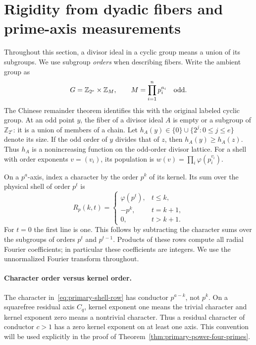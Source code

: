 \section{Rigidity from dyadic fibers and prime-axis measurements}
\label{sec:primary-rigidity}

Throughout this section, a divisor ideal in a cyclic group means a union
of its subgroups. We use subgroup \emph{orders} when describing fibers.
Write the ambient group as
\[
G=\mathbb Z_{2^e}\times \mathbb Z_M,
\qquad M=\prod_{i=1}^n p_i^{a_i}\quad\hbox{odd}.
\]
The Chinese remainder theorem identifies this with the original labeled
cyclic group. At an odd point \(y\), the fiber of a divisor ideal \(A\)
is empty or a subgroup of \(\mathbb Z_{2^e}\): it is a union of members
of a chain. Let \(h_A(y)\in\{0\}\cup\{2^j:0\le j\le e\}\)
denote its size. If the odd
order of \(y\) divides that of \(z\), then \(h_A(y)\ge h_A(z)\).
Thus \(h_A\) is a nonincreasing function on the odd-order divisor lattice.
For a shell with order exponents \(v=(v_i)\), its population is
\(w(v)=\prod_i\varphi(p_i^{v_i})\).

On a \(p^a\)-axis, index a character by the order \(p^k\) of its
kernel. Its sum over the physical shell of order \(p^t\) is
\begin{equation}
R_p(k,t)=
\begin{cases}
\varphi(p^t),&t\le k,\\
-p^k,&t=k+1,\\
0,&t>k+1.
\end{cases}
\label{eq:primary-shell-row}
\end{equation}
For \(t=0\) the first line is one. This follows by subtracting the
character sums over the subgroups of orders \(p^t\) and \(p^{t-1}\).
Products of these rows compute all radial Fourier coefficients; in
particular these coefficients are integers. We use the unnormalized
Fourier transform throughout.

\paragraph{Character order versus kernel order.}
The character in~\eqref{eq:primary-shell-row} has conductor
\(p^{a-k}\), not \(p^k\). On a squarefree residual axis \(C_q\),
kernel exponent one means the trivial character and kernel exponent zero
means a nontrivial character. Thus a residual character of conductor
\(c>1\) has a zero kernel exponent on at least one axis. This convention
will be used explicitly in the proof of Theorem~\ref{thm:primary-power-four-primes}.


